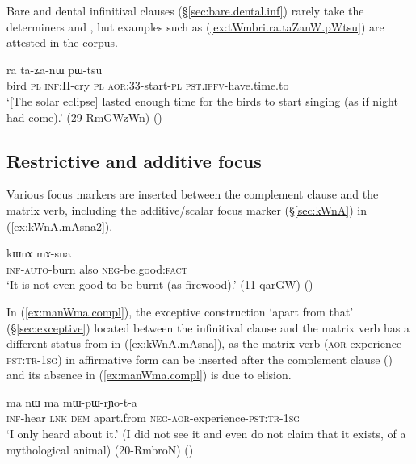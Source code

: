Bare and dental infinitival clauses (§\ref{sec:bare.dental.inf}) rarely take the determiners  and , but examples such as (\ref{ex:tWmbri.ra.taZanW.pWtsu}) are attested in the corpus.

\begin{exe}
\ex \label{ex:tWmbri.ra.taZanW.pWtsu}
 ra ta-ʑa-nɯ pɯ-tsu \\
bird \textsc{pl} \textsc{inf}:II-cry \textsc{pl} \textsc{aor}:3\fl{}3-start-\textsc{pl} \textsc{pst}.\textsc{ipfv}-have.time.to \\
\glt `[The solar eclipse] lasted enough time for the birds to start singing (as if night had come).' (29-RmGWzWn)
()
\end{exe}
 
 
\subsection{Restrictive and additive focus} \label{sec:complement.restriction}
Various focus markers are inserted between the complement clause and the matrix verb, including the additive/scalar focus marker  (§\ref{sec:kWnA}) in (\ref{ex:kWnA.mAsna2}).

\begin{exe}
\ex \label{ex:kWnA.mAsna2}
\gll [kɤ-nɯ-βlɯ] kɯnɤ mɤ-sna \\
\textsc{inf}-\textsc{auto}-burn also \textsc{neg}-be.good:\textsc{fact} \\
\glt `It is not even good to be burnt (as firewood).' (11-qarGW)
()
\end{exe}

In (\ref{ex:manWma.compl}),  the exceptive construction  `apart from that' (§\ref{sec:exceptive})  located between the infinitival clause  and the matrix verb has a different status from  in (\ref{ex:kWnA.mAsna}), as the matrix verb  (\textsc{aor}-experience-\textsc{pst}:\textsc{tr}-\textsc{1sg}) in affirmative form can be inserted after the complement clause () and its absence in (\ref{ex:manWma.compl}) is due to elision.

\begin{exe}
\ex \label{ex:manWma.compl}
\gll  [kɤ-mtsʰɤm] ma nɯ ma mɯ-pɯ-rɲo-t-a \\
\textsc{inf}-hear \textsc{lnk} \textsc{dem} apart.from \textsc{neg}-\textsc{aor}-experience-\textsc{pst}:\textsc{tr}-\textsc{1sg} \\
\glt `I only heard about it.' (I did not see it and even do not claim that it exists, of a mythological animal) (20-RmbroN)
()
\end{exe}

